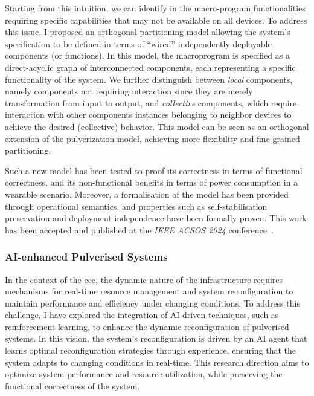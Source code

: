 \documentclass[runningheads]{llncs}
\begin{document}
Starting from this intuition,
we can identify in the macro-program functionalities requiring specific capabilities that may not be available on all devices.
%
To address this issue,
I proposed an orthogonal partitioning model allowing the system's specification to be defined in terms of ``wired'' independently deployable components (or functions).
%
In this model,
the macroprogram is specified as a direct-acyclic graph of interconnected components,
each representing a specific functionality of the system.
%
We further distinguish between \emph{local} components,
namely components not requiring interaction since they are merely transformation from input to output,
and \emph{collective} components,
which require interaction with other components instances belonging to neighbor devices to achieve the desired (collective) behavior.
%
This model can be seen as an orthogonal extension of the pulverization model,
achieving more flexibility and fine-grained partitioning.

Such a new model has been tested to proof its correctness in terms of functional correctness,
and its non-functional benefits in terms of power consumption in a wearable scenario.
Moreover,
a formalisation of the model has been provided through operational semantics,
and properties such as self-stabilisation preservation and deployment independence have been formally proven.
%
This work has been accepted and published at the \emph{IEEE ACSOS 2024} conference~\cite{DBLP:conf/acsos/FarabegoliVC24}.

\subsubsection{AI-enhanced Pulverised Systems}

In the context of the \ac{ecc},
the dynamic nature of the infrastructure requires mechanisms for real-time resource management and system reconfiguration to maintain performance and efficiency under changing conditions.
%
To address this challenge,
I have explored the integration of AI-driven techniques,
such as reinforcement learning,
to enhance the dynamic reconfiguration of pulverised systems.
%
In this vision,
the system's reconfiguration is driven by an AI agent that learns optimal reconfiguration strategies through experience,
ensuring that the system adapts to changing conditions in real-time.
%
This research direction aims to optimize system performance and resource utilization,
while preserving the functional correctness of the system.
\end{document}
